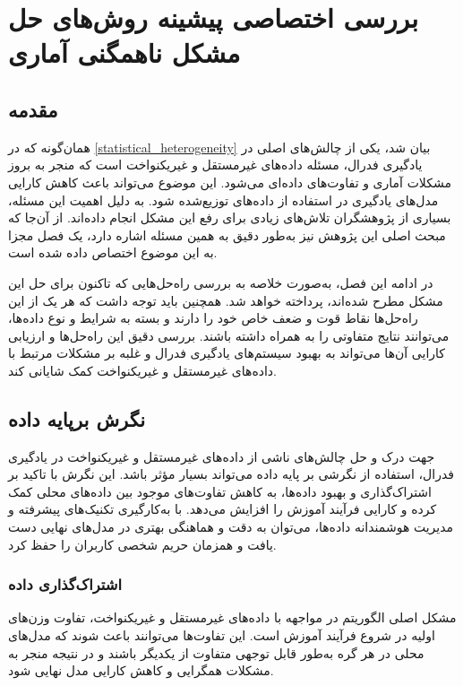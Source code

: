 \chapter{بررسی اختصاصی پیشینه روش‌های حل مشکل ناهمگنی آماری}

\section{مقدمه}
همان‌گونه که در
\ref{statistical_heterogeneity}
بیان شد،
یکی از چالش‌های اصلی در یادگیری فدرال، مسئله داده‌های غیرمستقل و غیریکنواخت
است که منجر به بروز مشکلات آماری و تفاوت‌های داده‌ای می‌شود. این موضوع می‌تواند باعث کاهش کارایی مدل‌های یادگیری در استفاده از داده‌های توزیع‌شده شود. به دلیل اهمیت این مسئله، بسیاری از پژوهشگران تلاش‌های زیادی برای رفع این مشکل انجام داده‌اند.
از آن‌جا که مبحث اصلی این پژوهش نیز به‌طور دقیق به همین مسئله اشاره دارد، یک فصل مجزا به این موضوع اختصاص داده شده است.

در ادامه این فصل، به‌صورت خلاصه به بررسی راه‌حل‌هایی که تاکنون برای حل این مشکل مطرح شده‌اند، پرداخته خواهد شد. همچنین باید توجه داشت که هر یک از این راه‌حل‌ها نقاط قوت و ضعف خاص خود را دارند و بسته به شرایط و نوع داده‌ها، می‌توانند نتایج متفاوتی را به همراه داشته باشند. بررسی دقیق این راه‌حل‌ها و ارزیابی کارایی آن‌ها می‌تواند به بهبود سیستم‌های یادگیری فدرال و غلبه بر مشکلات مرتبط با داده‌های غیرمستقل و غیریکنواخت کمک شایانی کند.

\section{نگرش برپایه داده}
جهت درک و حل چالش‌های ناشی از داده‌های غیرمستقل و غیریکنواخت در یادگیری فدرال، استفاده از نگرشی بر پایه داده می‌تواند بسیار مؤثر باشد. این نگرش با تاکید بر اشتراک‌گذاری و بهبود داده‌ها، به کاهش تفاوت‌های موجود بین داده‌های محلی کمک کرده و کارایی فرآیند آموزش را افزایش می‌دهد. با به‌کارگیری تکنیک‌های پیشرفته و مدیریت هوشمندانه داده‌ها، می‌توان به دقت و هماهنگی بهتری در مدل‌های نهایی دست یافت و همزمان حریم شخصی کاربران را حفظ کرد.

\subsection{اشتراک‌گذاری داده}
مشکل اصلی الگوریتم
در مواجهه با داده‌های غیرمستقل و غیریکنواخت، تفاوت وزن‌های اولیه در شروع فرآیند آموزش است. این تفاوت‌ها می‌توانند باعث شوند که مدل‌های محلی در هر گره به‌طور قابل توجهی متفاوت از یکدیگر باشند و در نتیجه منجر به مشکلات همگرایی و کاهش کارایی مدل نهایی ‌شود.

